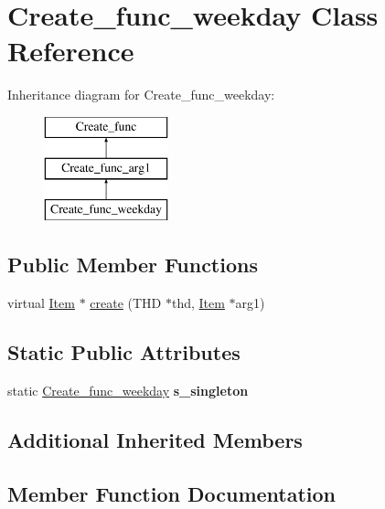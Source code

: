 \hypertarget{classCreate__func__weekday}{}\section{Create\+\_\+func\+\_\+weekday Class Reference}
\label{classCreate__func__weekday}
Inheritance diagram for Create\+\_\+func\+\_\+weekday\+:\begin{figure}[H]
\begin{center}
\leavevmode
\includegraphics[height=3.000000cm]{classCreate__func__weekday}
\end{center}
\end{figure}
\subsection*{Public Member Functions}
\begin{DoxyCompactItemize}
\item 
virtual \mbox{\hyperlink{classItem}{Item}} $\ast$ \mbox{\hyperlink{classCreate__func__weekday_aeed3a845770829084ec9ae9e597be903}{create}} (T\+HD $\ast$thd, \mbox{\hyperlink{classItem}{Item}} $\ast$arg1)
\end{DoxyCompactItemize}
\subsection*{Static Public Attributes}
\begin{DoxyCompactItemize}
\item 
\mbox{\label{classCreate__func__weekday_aa498a39d0b60e27357ec7292a503a447}} 
static \mbox{\hyperlink{classCreate__func__weekday}{Create\+\_\+func\+\_\+weekday}} {\bfseries s\+\_\+singleton}
\end{DoxyCompactItemize}
\subsection*{Additional Inherited Members}


\subsection{Member Function Documentation}
\mbox{\label{classCreate__func__weekday_aeed3a845770829084ec9ae9e597be903}} 
